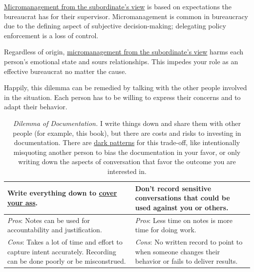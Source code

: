\hyperref[table:dilemma-personal-solution-provider]{Micromanagement from the subordinate's view} is based on expectations the bureaucrat has for their supervisor. Micromanagement is common in bureaucracy due to the defining aspect of subjective decision-making; delegating policy enforcement is a loss of control. 

Regardless of origin, \hyperref[table:dilemma-personal-solution-provider]{micromanagement from the subordinate's view} harms each person's emotional state and sours relationships. This impedes your role as an effective bureaucrat no matter the cause.

Happily, this dilemma can be remedied by talking with the other people involved in the situation. Each person has to be willing to express their concerns and to adapt their behavior. 

\begin{center}
\begin{table}[H] %
\begin{tabular}{ | m{\dilemmatablewidth}| m{\dilemmatablewidth} | } 
  \hline
  \textbf{Write everything down to \href{https://en.wikipedia.org/wiki/Cover_your_ass}{cover your ass}.
  \index{Wikipedia!\href{https://en.wikipedia.org/wiki/Cover_your_ass}{cover your ass}}
  } &
  \textbf{Don't record sensitive conversations that could be used against you or others.} \\
  \hline
  \textit{Pros}: Notes can be used for accountability and justification. &
  \textit{Pros}: Less time on notes is more time for doing work. \\
  \hline
  \textit{Cons}: Takes a lot of time and effort to capture intent accurately. Recording can be done poorly or be misconstrued.  & 
  \textit{Cons}: No written record to point to when someone changes their behavior or fails to deliver results. \\
  \hline
\end{tabular}
\caption{\textit{Dilemma of Documentation.}
I write things down and share them with other people (for example, this book), but there are costs and risks to investing in documentation. There are \href{https://en.wikipedia.org/wiki/Dark_pattern}{dark patterns}
for this trade-off, like intentionally misquoting another person to bias the documentation in your favor, or only writing down the aspects of conversation that favor the outcome you are interested in.  
}
\label{table:dilemma-personal-notes-or-no-notes}
\end{table}
\end{center}

